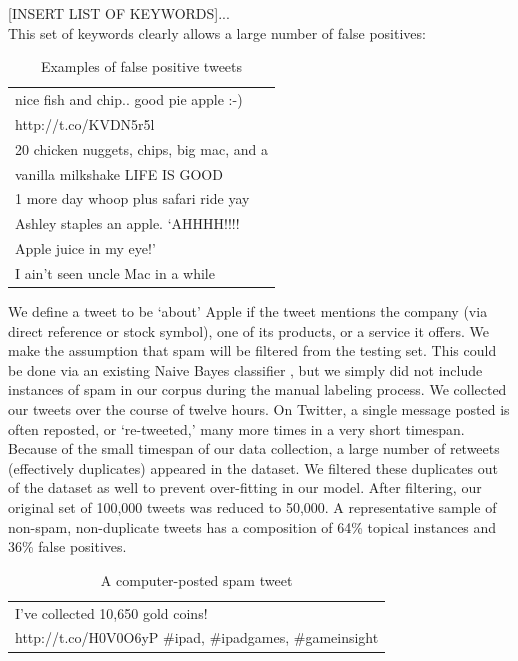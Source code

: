 \documentclass[letterpaper]{article}
\begin{document}
[INSERT LIST OF KEYWORDS]...\\

This set of keywords clearly allows a large number of false positives:

\begin{table}[h]
\centering
\begin{tabular}{|l|}
	\hline
	nice fish and chip.. good pie apple :-) \\ http://t.co/KVDN5r5l \\ \hline
	20 chicken nuggets, chips, big mac, and a \\ vanilla milkshake LIFE IS GOOD \\ \hline
	1 more day whoop plus safari ride yay \\ \hline
	Ashley staples an apple.  `AHHHH!!!! \\ Apple juice in my eye!' \\ \hline
	I ain't seen uncle Mac in a while \\
	\hline
\end{tabular}
\caption{Examples of false positive tweets}
\label{tab:myfirsttable}
\end{table}


We define a tweet to be `about' Apple if the tweet mentions the company (via direct reference or stock symbol), one of its products, or a service it offers. We make the assumption that spam will be filtered from the testing set. This could be done via an existing Naive Bayes classifier %
, but we simply did not include instances of spam in our corpus during the manual labeling process. We collected our tweets over the course of twelve hours. On Twitter, a single message posted is often reposted, or `re-tweeted,' many more times in a very short timespan. Because of the small timespan of our data collection, a large number of retweets (effectively duplicates) appeared in the dataset. We filtered these duplicates out of the dataset as well to prevent over-fitting in our model. After filtering, our original set of 100,000 tweets was reduced to 50,000. A representative sample of non-spam, non-duplicate tweets has a composition of 64\% topical instances and 36\% false positives.

\begin{table}[h]
\centering
\begin{tabular}{|l|}
	\hline
	I've collected 10,650 gold coins! \\ http://t.co/H0V0O6yP \#ipad, \#ipadgames, \#gameinsight\\
	\hline
\end{tabular}
\caption{A computer-posted spam tweet}
\end{table}
\end{document}
